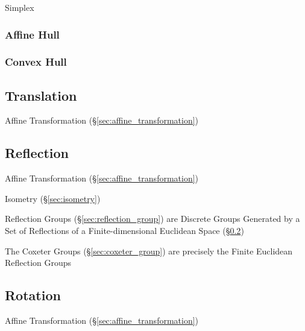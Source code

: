 
Simplex



\subsubsection{Affine Hull}\label{sec:affine_hull}

\subsubsection{Convex Hull}\label{sec:convex_hull}



\subsection{Translation}\label{sec:translation}

Affine Transformation (\S\ref{sec:affine_transformation})



\subsection{Reflection}\label{sec:reflection}

Affine Transformation (\S\ref{sec:affine_transformation})

Isometry (\S\ref{sec:isometry})

Reflection Groups (\S\ref{sec:reflection_group}) are Discrete Groups Generated
by a Set of Reflections of a Finite-dimensional Euclidean Space
(\S\ref{sec:reflection})

The Coxeter Groups (\S\ref{sec:coxeter_group}) are precisely the Finite
Euclidean Reflection Groups



\subsection{Rotation}\label{sec:rotation}

Affine Transformation (\S\ref{sec:affine_transformation})



